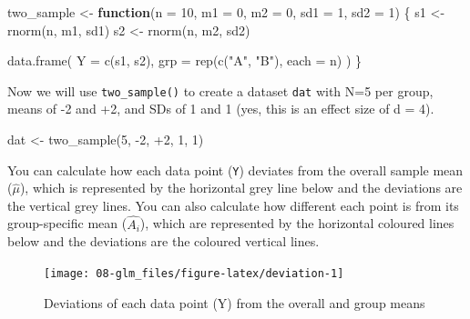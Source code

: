 \documentclass[
  oneside]{book}
\newenvironment{Shaded}{\begin{snugshade}}{\end{snugshade}}
\newcommand{\AttributeTok}[1]{\textcolor[rgb]{0.77,0.63,0.00}{#1}}
\newcommand{\ControlFlowTok}[1]{\textcolor[rgb]{0.13,0.29,0.53}{\textbf{#1}}}
\newcommand{\DecValTok}[1]{\textcolor[rgb]{0.00,0.00,0.81}{#1}}
\newcommand{\FunctionTok}[1]{\textcolor[rgb]{0.00,0.00,0.00}{#1}}
\newcommand{\NormalTok}[1]{#1}
\newcommand{\OtherTok}[1]{\textcolor[rgb]{0.56,0.35,0.01}{#1}}
\newcommand{\SpecialCharTok}[1]{\textcolor[rgb]{0.00,0.00,0.00}{#1}}
\newcommand{\StringTok}[1]{\textcolor[rgb]{0.31,0.60,0.02}{#1}}
\begin{document}
\begin{Shaded}
\begin{Highlighting}[]
\NormalTok{two\_sample }\OtherTok{\textless{}{-}} \ControlFlowTok{function}\NormalTok{(}\AttributeTok{n =} \DecValTok{10}\NormalTok{, }\AttributeTok{m1 =} \DecValTok{0}\NormalTok{, }\AttributeTok{m2 =} \DecValTok{0}\NormalTok{, }\AttributeTok{sd1 =} \DecValTok{1}\NormalTok{, }\AttributeTok{sd2 =} \DecValTok{1}\NormalTok{) \{}
\NormalTok{  s1 }\OtherTok{\textless{}{-}} \FunctionTok{rnorm}\NormalTok{(n, m1, sd1)}
\NormalTok{  s2 }\OtherTok{\textless{}{-}} \FunctionTok{rnorm}\NormalTok{(n, m2, sd2)}
  
  \FunctionTok{data.frame}\NormalTok{(}
    \AttributeTok{Y =} \FunctionTok{c}\NormalTok{(s1, s2),}
    \AttributeTok{grp =} \FunctionTok{rep}\NormalTok{(}\FunctionTok{c}\NormalTok{(}\StringTok{"A"}\NormalTok{, }\StringTok{"B"}\NormalTok{), }\AttributeTok{each =}\NormalTok{ n)}
\NormalTok{  )}
\NormalTok{\}}
\end{Highlighting}
\end{Shaded}

Now we will use \texttt{two\_sample()} to create a dataset \texttt{dat} with N=5 per group, means of -2 and +2, and SDs of 1 and 1 (yes, this is an effect size of d = 4).

\begin{Shaded}
\begin{Highlighting}[]
\NormalTok{dat }\OtherTok{\textless{}{-}} \FunctionTok{two\_sample}\NormalTok{(}\DecValTok{5}\NormalTok{, }\SpecialCharTok{{-}}\DecValTok{2}\NormalTok{, }\SpecialCharTok{+}\DecValTok{2}\NormalTok{, }\DecValTok{1}\NormalTok{, }\DecValTok{1}\NormalTok{)}
\end{Highlighting}
\end{Shaded}

You can calculate how each data point (\texttt{Y}) deviates from the overall sample mean (\(\hat{\mu}\)), which is represented by the horizontal grey line below and the deviations are the vertical grey lines. You can also calculate how different each point is from its group-specific mean (\(\hat{A_i}\)), which are represented by the horizontal coloured lines below and the deviations are the coloured vertical lines.

\begin{figure}

{\centering \texttt{[image: 08-glm\_files/figure-latex/deviation-1]} 

}

\caption{Deviations of each data point (Y) from the overall and group means}\label{fig:deviation}
\end{figure}
\end{document}
